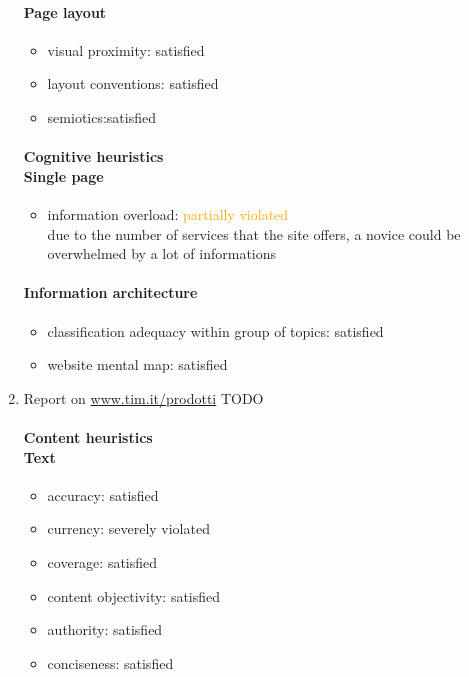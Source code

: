 \begin{enumerate}
	\paragraph*{Page layout}
	\begin{itemize}
		\item visual proximity: satisfied
		\item layout conventions: satisfied
		\item semiotics:satisfied
	\end{itemize}	
	
	\paragraph*{Cognitive heuristics \\ Single page}
	\begin{itemize}
		\item information overload: \textcolor{orange}{partially violated}\\
		due to the number of services that the site offers, a novice could be overwhelmed by a lot of informations
	\end{itemize}	
	
	\paragraph*{Information architecture}
	\begin{itemize}
		\item classification adequacy within group of topics: satisfied
		\item website mental map: satisfied
	\end{itemize}


\item Report on \url{www.tim.it/prodotti} TODO
	\paragraph*{Content heuristics \\ Text}
	\begin{itemize}
		\item accuracy: satisfied
		\item currency: severely violated
		\item coverage: satisfied
		\item content objectivity: satisfied
		\item authority: satisfied
		\item conciseness: satisfied		
	\end{itemize}


\end{enumerate}
